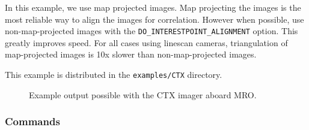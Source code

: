 In this example, we use map projected images. Map projecting the
images is the most reliable way to align the images for
correlation. However when possible, use non-map-projected images with
the \texttt{DO\_INTERESTPOINT\_ALIGNMENT} option. This greatly improves
speed. For all cases using linescan cameras, triangulation of
map-projected images is 10x slower than non-map-projected images.

This example is distributed in the \texttt{examples/CTX} directory.

\begin{figure}[b!]
\centering
  \hfil
\caption{Example output possible with the CTX imager aboard MRO.}
\label{fig:ctx_example}
\end{figure}

\subsubsection*{Commands}

